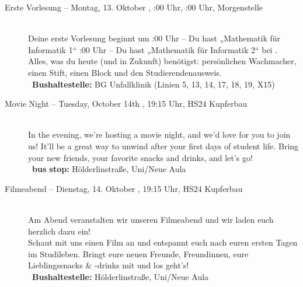 \begin{description}
\ifbachelor
    \item[Erste Vorlesung -- Montag, 13. Oktober \YEAR, \ifwintersemester 8:00 Uhr, \else 10:00 Uhr, \fi Morgenstelle]~\\
    Deine erste Vorlesung beginnt um
    :00 Uhr -- Du hast „Mathematik für Informatik 1“  \fi
    :00 Uhr -- Du hast „Mathematik für Informatik 2“  \fi
    bei \Matheprof.
    Alles, was du heute (und in Zukunft) benötigst: persönlichen Wachmacher, einen Stift, einen Block und den Studierendenausweis.\\
    ~\textbf{Bushaltestelle:} BG Unfallklinik (Linien 5, 13, 14, 17, 18, 19, X15)
\fi

\ifml
    \item[Movie Night -- Tuesday, October 14th \YEAR, 19:15 Uhr, HS24 Kupferbau]~\\%
    In the evening, we're hosting a movie night, and we'd love for you to join us!
    It'll be a great way to unwind after your first days of student life.
    Bring your new friends, your favorite snacks and drinks, and let's go!\\
    ~\textbf{bus stop:}  Hölderlinstraße, Uni/Neue Aula 
\else
    \item[Filmeabend -- Dienstag, 14. Oktober \YEAR, 19:15 Uhr, HS24 Kupferbau]~\\
    Am Abend veranstalten wir unseren Filmeabend und wir laden euch herzlich dazu ein!\\
    Schaut mit uns einen Film an und entspannt euch nach euren ersten Tagen im Studileben.
    Bringt eure neuen Freunde, Freundinnen, eure Lieblingssnacks \& -drinks mit und los geht's!\\
    ~\textbf{Bushaltestelle:} Hölderlinstraße, Uni/Neue Aula
\fi


\end{description}
